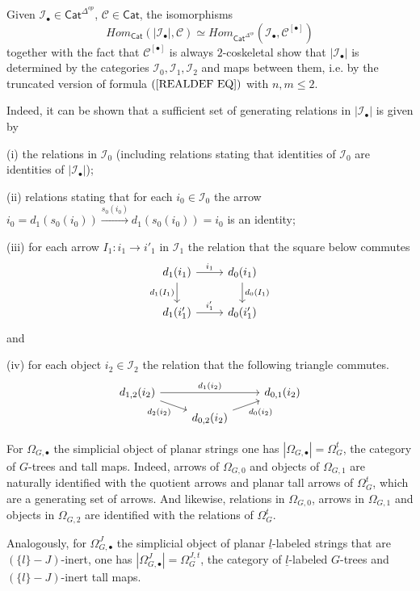 \documentclass[a4paper,10pt]{article}%
\begin{document}
\begin{remark}
  Given $\mathcal{I}_{\bullet} \in \mathsf{Cat}^{\Delta^{op}}$, $\mathcal{C} \in \mathsf{Cat}$, the isomorphisms
  \[
  Hom_{\mathsf{Cat}}(|\mathcal{I}_{\bullet}|,\mathcal{C})
  \simeq
  Hom_{\mathsf{Cat}^{\Delta^{op}}}(\mathcal{I}_{\bullet},\mathcal{C}^{[\bullet]})
  \]
  together with the fact that $\mathcal{C}^{[\bullet]}$ is always $2$-coskeletal show that $|\mathcal{I}_{\bullet}|$
  is determined by the categories 
  $\mathcal{I}_0,\mathcal{I}_1,\mathcal{I}_2$
  and maps between them, i.e. by the truncated version of
  formula $(\ref{REALDEF EQ})$ with $n,m \leq 2$.

  Indeed, it can be shown that a sufficient set of generating relations in $|\mathcal{I}_{\bullet}|$ is given by
  \begin{inparaenum}
  \item[(i)]
    the relations in $\mathcal{I}_0$
    (including relations stating that identities of  
    $\mathcal{I}_0$ are identities of $|\mathcal{I}_{\bullet}|$);
  \item[(ii)] relations stating that for each $i_0 \in \mathcal{I}_0$ the arrow 
    $i_0 = d_1(s_0(i_0)) \xrightarrow{s_0(i_0)} d_1(s_0(i_0)) = i_0$
    is an identity;
  \item[(iii)] for each arrow $I_1\colon i_1 \to i'_1$ in $\mathcal{I}_1$ the relation that the square below commutes
    \[
    \begin{tikzcd}
      d_1(i_1) \ar{r}{i_1} \ar{d}[swap]{d_1(I_1)} & 
      d_0(i_1) \ar{d}{d_0(I_1)}
      \\
      d_1(i'_1) \ar{r}{i'_1} &
      d_0(i'_1)
    \end{tikzcd}
    \]
    and
  \item[(iv)] for each object $i_2 \in \mathcal{I}_2$ the relation that the following triangle commutes.
    \[
    \begin{tikzcd}[row sep = 0.5em]
      d_{1,2}(i_2) \ar{rr}{d_1(i_2)} \ar{rd}[swap]{d_2(i_2)} & & d_{0,1}(i_2) \\
      & d_{0,2}(i_2) \ar{ru}[swap]{d_0(i_2)}
    \end{tikzcd}
    \]
  \end{inparaenum}
\end{remark}


\begin{example}\label{PLANARSTRING EX}
  For $\Omega_{G,\bullet}$ the simplicial object of planar strings one has $|\Omega_{G,\bullet}| = \Omega_G^t$, the category of $G$-trees and tall maps. Indeed, arrows of $\Omega_{G,0}$ and objects of $\Omega_{G,1}$ are naturally identified with the quotient arrows and planar tall arrows of $\Omega_G^t$, which are a generating set of arrows.
  And likewise, relations in $\Omega_{G,0}$, 
  arrows in $\Omega_{G,1}$ and 
  objects in $\Omega_{G,2}$ are identified with the relations of $\Omega_G^t$.

  Analogously, for $\Omega_{G,\bullet}^J$ the simplicial object of planar $\underline{l}$-labeled strings that are 
  $(\{l\}-J)$-inert, one has $|\Omega_{G,\bullet}^J| = \Omega_G^{J,t}$,
  the category of $\underline{l}$-labeled $G$-trees and $(\{l\}-J)$-inert tall maps.
\end{example}
\end{document}
